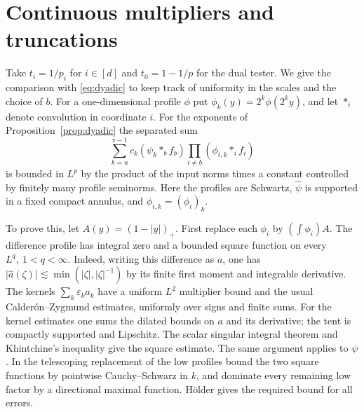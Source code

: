 \documentclass[11pt]{article}
\begin{document}
\section{Continuous multipliers and truncations}\label{sec:continuum}
Take \(t_i=1/p_i\) for \(i\in[d]\) and \(t_0=1-1/p\) for the
dual tester. We give the comparison with \eqref{eq:dyadic} to
keep track of uniformity in the scales and the choice of \(b\).
For a one-dimensional profile \(\phi\) put
\(\phi_k(y)=2^k\phi(2^k y)\), and let \(*_i\) denote convolution in
coordinate \(i\). For the exponents of Proposition~\ref{prop:dyadic}
the separated sum
\begin{equation}\label{eq:smoothcone}
   \sum_{k=u}^{v-1} c_k(\psi_k*_b f_b)
                   \prod_{i\ne b}(\phi_{i,k}*_i f_i)
\end{equation}
is bounded in \(L^p\) by the product of the input norms times a
constant controlled by finitely many profile seminorms. Here the
profiles are Schwartz, \(\widehat\psi\) is supported in a fixed
compact annulus, and \(\phi_{i,k}=(\phi_i)_k\).

To prove this, let \(A(y)=(1-|y|)_+\). First replace each
\(\phi_i\) by \((\int\phi_i)A\). The difference profile has integral
zero and a bounded square function on every \(L^q,\ 1<q<\infty\).
Indeed, writing this difference as \(a\), one has
\(\lvert\widehat a(\zeta)\rvert\lesssim
 \min(|\zeta|,|\zeta|^{-1})\) by its finite first moment and
integrable derivative. The kernels \(\sum_k\varepsilon_k a_k\)
have a uniform \(L^2\) multiplier bound and the usual
Calder\'on--Zygmund estimates, uniformly over signs and finite
sums. For the kernel estimates one sums the dilated bounds on
\(a\) and its derivative; the tent is compactly supported and
Lipschitz. The scalar singular integral theorem and Khintchine's
inequality give the square estimate. The same argument applies
to \(\psi\). In the telescoping replacement of the low profiles
bound the two square functions by pointwise Cauchy--Schwarz in
\(k\), and dominate every remaining low factor by a directional
maximal function. H\"older gives the required bound for all errors.
\end{document}
